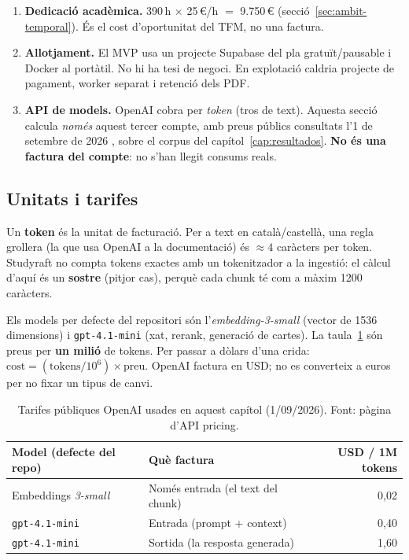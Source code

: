 \begin{enumerate}
  \item \textbf{Dedicació acadèmica.} 390\,h $\times$ 25\,€/h $=$ 9.750\,€ (secció~\ref{sec:ambit-temporal}). És el cost d'oportunitat del TFM, no una factura.
  \item \textbf{Allotjament.} El MVP usa un projecte Supabase del pla gratuït/pausable i Docker al portàtil. No hi ha tesi de negoci. En explotació caldria projecte de pagament, worker separat i retenció dels PDF.
  \item \textbf{API de models.} OpenAI cobra per \emph{token} (tros de text). Aquesta secció calcula \emph{només} aquest tercer compte, amb preus públics consultats l'1 de setembre de 2026 \parencite{openai-pricing}, sobre el corpus del capítol~\ref{cap:resultados}. \textbf{No és una factura del compte}: no s'han llegit consums reals.
\end{enumerate}

\subsection{Unitats i tarifes}

Un \textbf{token} és la unitat de facturació. Per a text en català/castellà, una regla grollera (la que usa OpenAI a la documentació) és $\approx 4$ caràcters per token. Studyraft no compta tokens exactes amb un tokenitzador a la ingestió: el càlcul d'aquí és un \textbf{sostre} (pitjor cas), perquè cada chunk té com a màxim 1200 caràcters.

Els models per defecte del repositori són l'\emph{embedding-3-small} (vector de 1536 dimensions) i \texttt{gpt-4.1-mini} (xat, rerank, generació de cartes). La taula~\ref{tab:tarifes} són preus per \textbf{un milió} de tokens. Per passar a dòlars d'una crida: $\mathrm{cost} = (\text{tokens}/10^{6})\times\text{preu}$. OpenAI factura en USD; no es converteix a euros per no fixar un tipus de canvi.

\begin{table}[htbp]
\centering
\caption{Tarifes públiques OpenAI usades en aquest capítol (1/09/2026). Font: pàgina d'API pricing.}
\label{tab:tarifes}
\small
\begin{tabularx}{\textwidth}{l X r}
\toprule
Model (defecte del repo) & Què factura & USD / 1M tokens \\
\midrule
Embeddings \emph{3-small} & Només entrada (el text del chunk) & 0,02 \\
\texttt{gpt-4.1-mini} & Entrada (prompt + context) & 0,40 \\
\texttt{gpt-4.1-mini} & Sortida (la resposta generada) & 1,60 \\
\bottomrule
\end{tabularx}
\end{table}

